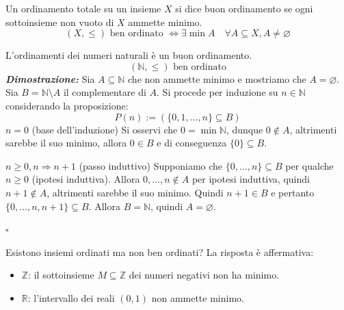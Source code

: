 \documentclass[oneside]{book}
\theoremstyle{remark}
\newcommand{\cvd}{\begin{flushright}$\square$\end{flushright}} %
\begin{document}
\begin{tcolorbox}[colback=yellow!30, colframe=yellow!30!black, title=Insieme ben ordinato]
Un ordinamento totale su un insieme $X$ si dice buon ordinamento se ogni sottoinsieme
non vuoto di $X$ ammette minimo.
\[ (X,\leq) \text{ ben ordinato } \Longleftrightarrow \exists \min A \quad \forall A \subseteq X, A \not = \varnothing \]
\end{tcolorbox}

\begin{tcolorbox}[title={Buon ordinamento di $\mathbb{N}$}]
L'ordinamenti dei numeri naturali è un buon ordinamento.
\[ (\mathbb{N},\leq) \text{ ben ordinato} \]
\emph{\textbf{Dimostrazione:}} Sia $A \subseteq \mathbb{N}$ che non
ammette minimo e mostriamo che $A = \varnothing$.
Sia $B = \mathbb{N}\setminus A$ il complementare di $A$. Si procede per induzione su
$n \in \mathbb{N}$ considerando la proposizione:
\[ P(n) := \left(\{0,1,...,n\} \subseteq B\right) \]
$n=0$ (base dell'induzione) Si osservi che $0 = \min\mathbb{N}$, dunque
$0 \not \in A$, altrimenti sarebbe il suo minimo,
allora $0 \in B$ e di conseguenza $\{0\} \subseteq B$.

$n\geq0, n\Longrightarrow n+1$ (passo induttivo)
Supponiamo che $\{0,...,n\} \subseteq B$ per qualche $n\geq0$ (ipotesi
induttiva). Allora
$0,...,n \not \in A$ per ipotesi induttiva, quindi $n+1 \not \in A$,
altrimenti sarebbe il suo minimo. Quindi $n+1 \in B$ e pertanto
$\{0,...,n,n+1\} \subseteq B$. Allora $B = \mathbb{N}$, quindi
$A = \varnothing$.
\cvd
\end{tcolorbox}

Esistono insiemi ordinati ma non ben ordinati? La risposta è affermativa:
\begin{itemize}
    \item $\mathbb{Z}$: il sottoinsieme $M\subseteq \mathbb{Z}$ dei numeri negativi non ha minimo.
    \item $\mathbb{R}$: l'intervallo dei reali $(0,1)$ non ammette minimo.
\end{itemize}
\end{document}
